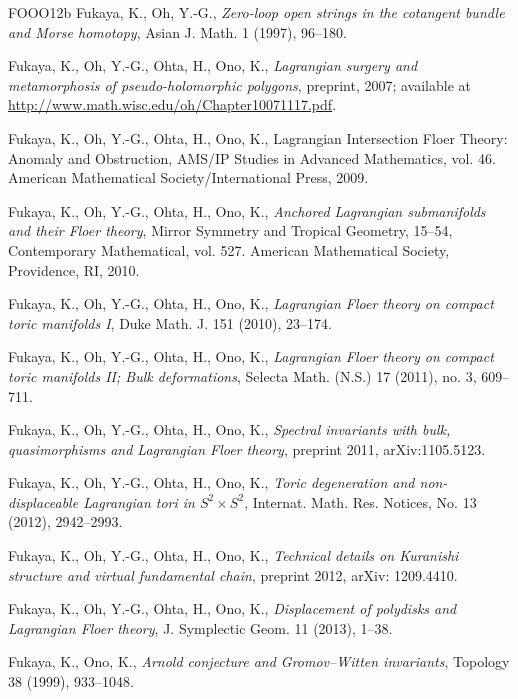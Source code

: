 \begin{thebibliography}{FOOO12b}
 Fukaya, K., Oh, Y.-G., \emph{Zero-loop open strings in the cotangent bundle and
  Morse homotopy}, Asian J. Math. 1 (1997), 96–180.

 Fukaya, K., Oh, Y.-G., Ohta, H., Ono, K., \emph{Lagrangian surgery and
  meta\-morphosis of pseudo-holomorphic polygons}, preprint, 2007; available at
  \url{http://www.math.wisc.edu/oh/Chapter10071117.pdf}.

 Fukaya, K., Oh, Y.-G., Ohta, H., Ono, K., Lagrangian Intersection Floer Theory:
  Anomaly and Obstruction, AMS/IP Studies in Advanced Math\-ematics, vol. 46. American Mathematical
  Society/International Press, 2009.

 Fukaya, K., Oh, Y.-G., Ohta, H., Ono, K., \emph{Anchored Lagrangian
  subman\-ifolds and their Floer theory}, Mirror Symmetry and Tropical Geometry, 15–54, Contemporary
  Mathematical, vol. 527. American Mathematical Society, Providence, RI, 2010.

 Fukaya, K., Oh, Y.-G., Ohta, H., Ono, K., \emph{Lagrangian Floer theory on
  compact toric manifolds I}, Duke Math. J. 151 (2010), 23–174.

 Fukaya, K., Oh, Y.-G., Ohta, H., Ono, K., \emph{Lagrangian Floer theory on
  compact toric manifolds II; Bulk deformations}, Selecta Math. (N.S.) 17 (2011), no. 3, 609–711.

 Fukaya, K., Oh, Y.-G., Ohta, H., Ono, K., \emph{Spectral invariants with bulk,
  quasimorphisms and Lagrangian Floer theory}, preprint 2011, arXiv:1105.5123.

 Fukaya, K., Oh, Y.-G., Ohta, H., Ono, K., \emph{Toric degeneration and
  non-displaceable Lagrangian tori in $S^2\times S^2$}, Internat. Math. Res. Notices, No. 13 (2012),
  2942–2993.

 Fukaya, K., Oh, Y.-G., Ohta, H., Ono, K., \emph{Technical details on
  Kuran\-ishi structure and virtual fundamental chain}, preprint 2012, arXiv: 1209.4410.

 Fukaya, K., Oh, Y.-G., Ohta, H., Ono, K., \emph{Displacement of polydisks and
  Lagrangian Floer theory}, J. Symplectic Geom. 11 (2013), 1–38.

 Fukaya, K., Ono, K., \emph{Arnold conjecture and Gromov–Witten invariants},
  Topology 38 (1999), 933–1048.


\end{thebibliography}
